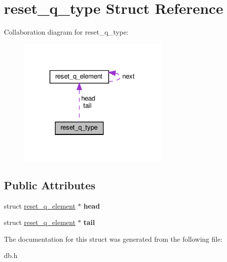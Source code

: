 \hypertarget{structreset__q__type}{}\section{reset\+\_\+q\+\_\+type Struct Reference}
\label{structreset__q__type}


Collaboration diagram for reset\+\_\+q\+\_\+type\+:
\nopagebreak
\begin{figure}[H]
\begin{center}
\leavevmode
\includegraphics[width=209pt]{structreset__q__type__coll__graph}
\end{center}
\end{figure}
\subsection*{Public Attributes}
\begin{DoxyCompactItemize}
\item 
\mbox{\label{structreset__q__type_a707beadd5f954e4892e43783a7ea5ab7}} 
struct \hyperlink{structreset__q__element}{reset\+\_\+q\+\_\+element} $\ast$ {\bfseries head}
\item 
\mbox{\label{structreset__q__type_aaaf7b8cc04aec7fd039d60a73da6705e}} 
struct \hyperlink{structreset__q__element}{reset\+\_\+q\+\_\+element} $\ast$ {\bfseries tail}
\end{DoxyCompactItemize}


The documentation for this struct was generated from the following file\+:\begin{DoxyCompactItemize}
\item 
db.\+h\end{DoxyCompactItemize}
